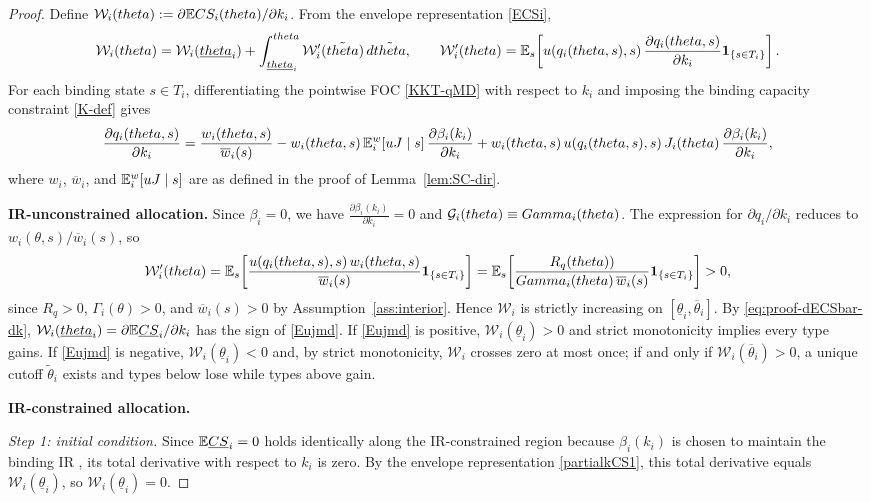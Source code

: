 \documentclass{class}
\begin{document}
\begin{proof}
Define $\mathcal W_i(theta) := \partial \mathbb{E} CS_i(theta)/\partial k_i$. From the envelope representation \ref{ECSi},
\[\mathcal W_i(theta) = \mathcal W_i(\underline{theta}_i) + \int_{\underline{theta}_i}^{theta}\mathcal W_i'(\tilde{theta})\,d\tilde{theta}, \qquad \mathcal W_i'(theta) = \mathbb{E}_s\!\left[u\!\left(q_i(theta,s),s\right)\frac{\partial q_i(theta,s)}{\partial k_i}\mathbf 1_{\{s\in T_i\}}\right].\]
For each binding state $s\in T_i$, differentiating the pointwise FOC \ref{KKT-qMD} with respect to $k_i$ and imposing the binding capacity constraint \ref{K-def} gives
\[\frac{\partial q_i(theta,s)}{\partial k_i} = \frac{w_i(theta,s)}{\overline w_i(s)} - w_i(theta,s)\, \mathbb{E}_i^w[uJ\mid s]\,\frac{\partial \beta_i(k_i)}{\partial k_i} + w_i(theta,s)\,u\!\left(q_i(theta,s),s\right)J_i(theta)\,\frac{\partial \beta_i(k_i)}{\partial k_i},\]
where $w_i$, $\overline w_i$, and $\mathbb{E}_i^w[uJ\mid s]$ are as defined in the proof of Lemma~\ref{lem:SC-dir}.


\noindent\textbf{IR-unconstrained allocation.} Since $\beta_i = 0$, we have $\frac{\partial \beta_i(k_i)}{\partial k_i} = 0$ and $\mathcal{G}_i(theta)\equiv Gamma_i(theta)$. The expression for $\partial q_i/\partial k_i$ reduces to $w_i(\theta,s)/\overline w_i(s)$, so
\[\mathcal W_i'(theta) = \mathbb{E}_s\!\left[\frac{u(q_i(theta,s),s)\,w_i(theta,s)}{\overline w_i(s)}\mathbf 1_{\{s\in T_i\}}\right] = \mathbb{E}_s\!\left[\frac{R_q(theta))}{Gamma_i(theta)\,\overline w_i(s)}\mathbf 1_{\{s\in T_i\}}\right] > 0,\]
since $R_q > 0$, $\Gamma_i(\theta) > 0$, and $\overline w_i(s) > 0$ by Assumption~\ref{ass:interior}. Hence $\mathcal W_i$ is strictly increasing on $[\underline\theta_i,\overline\theta_i]$. By \ref{eq:proof-dECSbar-dk}, $\mathcal W_i(\underline{theta}_i)=\partial \mathbb{E}\underline{CS}_i/\partial k_i$ has the sign of \ref{Eujmd}. If \ref{Eujmd} is positive, $\mathcal W_i(\underline\theta_i)>0$ and strict monotonicity implies every type gains. If \ref{Eujmd} is negative, $\mathcal W_i(\underline\theta_i)<0$ and, by strict monotonicity, $\mathcal W_i$ crosses zero at most once; if and only if $\mathcal W_i(\overline\theta_i)>0$, a unique cutoff $\tilde\theta_i$ exists and types below lose while types above gain.


\noindent\textbf{IR-constrained allocation.}

\noindent\textit{Step 1: initial condition.} Since $\mathbb{E}\underline{CS}_i = 0$ holds identically along the IR-constrained region because $\beta_i(k_i)$ is chosen to maintain the binding IR , its total derivative with respect to $k_i$ is zero. By the envelope representation \ref{partialkCS1}, this total derivative equals $\mathcal W_i(\underline\theta_i)$, so $\mathcal W_i(\underline\theta_i) = 0$.


\end{proof}
\end{document}
